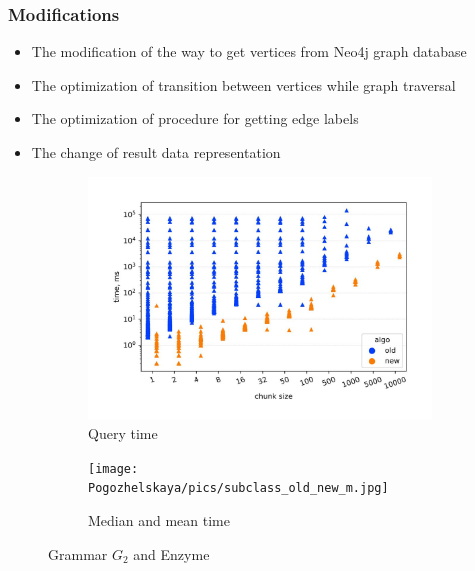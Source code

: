 \documentclass{beamer}
\begin{document}
    \begin{frame}
  \transwipe[direction=90]
 \frametitle{Modifications}
 \begin{itemize}
     \item The modification of the way to get vertices from Neo4j graph database
     \item The optimization of transition between vertices while graph traversal
     \item The optimization of procedure for getting edge labels
     \item The change of result data representation
 \end{itemize}
    \begin{figure}[H]
    \begin{subfigure}[b]{0.5\textwidth}
    \centering
    \includegraphics[width=\textwidth]{pics/subclass_old_new.jpg}
    \caption{Query time}
    \label{fig:subim1}
    \end{subfigure}%
    \begin{subfigure}[b]{0.5\textwidth}
    \centering
    \texttt{[image: Pogozhelskaya/pics/subclass\_old\_new\_m.jpg]}
    \caption{Median and mean time}
    \label{fig:subim2}
    \end{subfigure}
    \caption{Grammar $G_2$ and Enzyme}
    \label{old_new2}
\end{figure}
  \end{frame}
  
\end{document}
